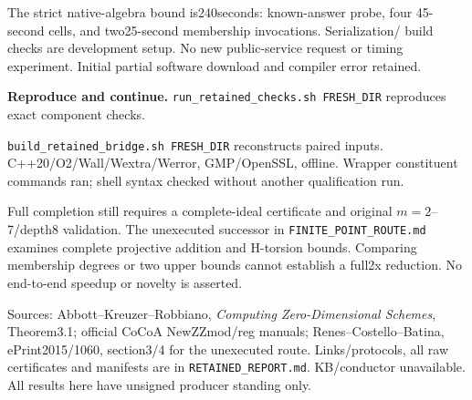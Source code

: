 \documentclass[10pt]{article}
\begin{document}
The strict native-algebra bound is240seconds: known-answer probe, four
45-second cells, and two25-second membership invocations. Serialization/
build checks are development setup. No new public-service request or timing
experiment. Initial partial software download and compiler error retained.

\textbf{Reproduce and continue.}
\texttt{run\_retained\_checks.sh FRESH\_DIR} reproduces exact component checks.

\texttt{build\_retained\_bridge.sh FRESH\_DIR} reconstructs paired inputs.
C++20/O2/Wall/Wextra/Werror, GMP/OpenSSL, offline. Wrapper constituent
commands ran; shell syntax checked without another qualification run.

Full completion still requires a complete-ideal certificate and original
$m=2$--7/depth8 validation. The unexecuted successor in
\texttt{FINITE\_POINT\_ROUTE.md} examines complete projective addition and
H-torsion bounds. Comparing membership degrees or two upper bounds cannot
establish a full2x reduction. No end-to-end speedup or novelty is asserted.

Sources: Abbott--Kreuzer--Robbiano, \emph{Computing Zero-Dimensional Schemes},
Theorem3.1; official CoCoA NewZZmod/reg manuals; Renes--Costello--Batina,
ePrint2015/1060, section3/4 for the unexecuted route. Links/protocols, all raw
certificates and manifests are in \texttt{RETAINED\_REPORT.md}. KB/conductor
unavailable. All results here have unsigned producer standing only.
\end{document}
